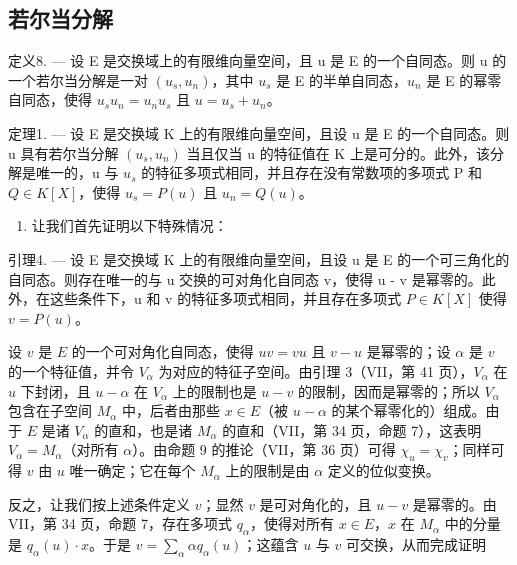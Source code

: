 \subsection{若尔当分解}

定义8. --- 设 E 是交换域上的有限维向量空间，且 u 是 E 的一个自同态。则 u 的一个若尔当分解是一对 \((u_{s}, u_{n})\)，其中 \(u_{s}\) 是 E 的半单自同态，\(u_{n}\) 是 E 的幂零自同态，使得 \(u_{s}u_{n} = u_{n}u_{s}\) 且 \(u = u_{s} + u_{n}\)。

定理1. --- 设 E 是交换域 K 上的有限维向量空间，且设 u 是 E 的一个自同态。则 u 具有若尔当分解 \((u_{s}, u_{n})\) 当且仅当 u 的特征值在 K 上是可分的。此外，该分解是唯一的，u 与 \(u_{s}\) 的特征多项式相同，并且存在没有常数项的多项式 P 和 \(Q \in K[X]\)，使得 \(u_{s} = P(u)\) 且 \(u_{n} = Q(u)\)。

\begin{enumerate}
\def\labelenumi{\Alph{enumi})}
\tightlist
\item
  让我们首先证明以下特殊情况：
\end{enumerate}

引理4. --- 设 E 是交换域 K 上的有限维向量空间，且设 u 是 E 的一个可三角化的自同态。则存在唯一的与 u 交换的可对角化自同态 v，使得 u - v 是幂零的。此外，在这些条件下，u 和 v 的特征多项式相同，并且存在多项式 \(P \in K[X]\) 使得 \(v = P(u)\)。

设 \(v\) 是 \(E\) 的一个可对角化自同态，使得 \(uv = vu\) 且 \(v - u\) 是幂零的；设 \(\alpha\) 是 \(v\) 的一个特征值，并令 \(V_{\alpha}\) 为对应的特征子空间。由引理 3（VII，第 41 页），\(V_{\alpha}\) 在 \(u\) 下封闭，且 \(u - \alpha\) 在 \(V_{\alpha}\) 上的限制也是 \(u - v\) 的限制，因而是幂零的；所以 \(V_{\alpha}\) 包含在子空间 \(M_{\alpha}\) 中，后者由那些 \(x \in E\)（被 \(u - \alpha\) 的某个幂零化的）组成。由于 \(E\) 是诸 \(V_{\alpha}\) 的直和，也是诸 \(M_{\alpha}\) 的直和（VII，第 34 页，命题 7），这表明 \(V_{\alpha} = M_{\alpha}\)（对所有 \(\alpha\)）。由命题 9 的推论（VII，第 36 页）可得 \(\chi_u = \chi_v\)；同样可得 \(v\) 由 \(u\) 唯一确定；它在每个 \(M_{\alpha}\) 上的限制是由 \(\alpha\) 定义的位似变换。

反之，让我们按上述条件定义 \(v\)；显然 \(v\) 是可对角化的，且 \(u - v\) 是幂零的。由 VII，第 34 页，命题 7，存在多项式 \(q_{\alpha}\)，使得对所有 \(x \in E\)，\(x\) 在 \(M_{\alpha}\) 中的分量是 \(q_{\alpha}(u) \cdot x\)。于是 \(v = \sum_{\alpha} \alpha q_{\alpha}(u)\)；这蕴含 \(u\) 与 \(v\) 可交换，从而完成证明
